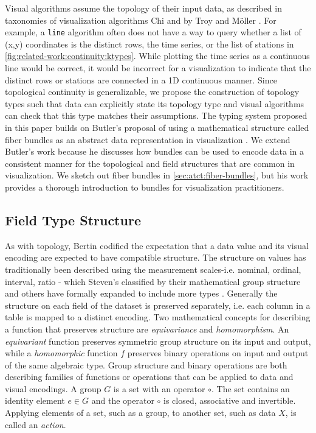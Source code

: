 \documentclass[10pt,journal,compsoc]{IEEEtran}
\theoremstyle{definition}
\theoremstyle{remark}
\begin{document}
Visual algorithms assume the topology of their input data, as described in taxonomies of visualization algorithms Chi\cite{chiTaxonomyVisualizationTechniques2000} and by Troy and M\"{o}ller \cite{toryRethinkingVisualizationHighlevel2004}. For example, a \texttt{line} algorithm often does not have a way to query whether a list of (x,y) coordinates is the distinct rows, the time series, or the list of stations in \autoref{fig:related-work:continuity:ktypes}. While plotting the time series as a continuous line would be correct, it would be incorrect for a visualization to indicate that the distinct rows or stations are connected in a 1D continuous manner. Since topological continuity is generalizable, we propose the construction of topology types such that data can explicitly state its topology type and visual algorithms can check that this type matches their assumptions. The typing system proposed in this paper builds on Butler's proposal of using a mathematical structure called fiber bundles as an abstract data representation in visualization \cite{butlerVectorBundleClassesForm1992, butlerVisualizationModelBased1989}. We extend Butler's work because he discusses how bundles can be used to encode data in a consistent manner for the topological and field structures that are common in visualization. We sketch out fiber bundles in \autoref{sec:atct:fiber-bundles}, but his work provides a thorough introduction to bundles for visualization practitioners. 

\subsection{Field Type Structure} 
\label{sec:related-work:equivariance}
As with topology, Bertin \cite{bertinSemiologyGraphicsDiagrams2011} codified the expectation that a data value and its visual encoding are expected to have compatible structure. The structure on values has traditionally been described  using the measurement scales-i.e. nominal, ordinal, interval, ratio - which Steven's classified by their mathematical group structure\cite{stevensTheoryScalesMeasurement1946a} and others have formally expanded to include more types \cite{leaFormalizationMeasurementScale, thomasMathematizationNotMeasurement2014}. Generally the structure on each field of the dataset is preserved separately, i.e. each column in a table is mapped to a distinct encoding. Two mathematical concepts for describing a function that preserves structure are \textit{equivariance} and \textit{homomorphism}. An \textit{equivariant} function preserves symmetric group structure on its input and output, while a \textit{homomorphic} function $f$ preserves binary operations on input and output of the same algebraic type. Group structure and binary operations are both describing families of functions or operations that can be applied to data and visual encodings. A group $G$ is a set with an operator $\circ$. The set contains an identity element $e \in G$ and the operator $\circ$ is closed, associative and invertible. Applying elements of a set, such as a group, to another set, such as data $X$, is called an \textit{action}.
\end{document}
